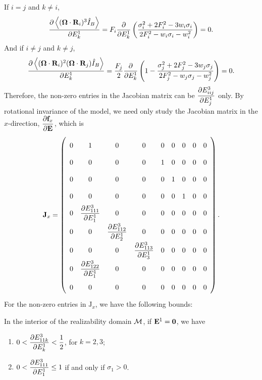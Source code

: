 If $i = j$ and $k \not= i$,
\[
\dfrac{\partial \left\langle (\boldsymbol{\Omega}\cdot\mathbf{R}_i)^3 \hat I_B \right\rangle}{\partial E^1_k} 
=  F_i \dfrac{\partial}{\partial E^1_k}\left( \dfrac{ \sigma_i^2 
    + 2 F_i^2 - 3 w_i \sigma_i }
  {2 F_i^2 - w_i \sigma_i - w_i^2}\right) 
= 0.
\]
And if $i \not= j$ and $k \not= j$,
\[
\dfrac{\partial \left\langle (\boldsymbol{\Omega}\cdot\mathbf{R}_i)^2 (\boldsymbol{\Omega}\cdot\mathbf{R}_j)
    \hat I_B \right\rangle}{\partial E^1_k} 
=  \dfrac{ F_j }{2}\dfrac{\partial}{\partial E^1_k} 
\left(1-\dfrac{ \sigma_j^2 
    + 2 F_j^2 - 3 w_j \sigma_j }
  { 2 F_j^2 - w_j \sigma_j - w_j^2 }
\right)
=  0.
\]
Therefore, the non-zero entries in the Jacobian matrix can be
$\dfrac{\partial E^3_{iij}}{\partial E^1_j}$ only. By rotational invariance of the model,
we need only study the Jacobian matrix in the $x$-direction,
$\dfrac{\partial \mathbf{f}_x}{\partial \mathbf{E}}$, which is
\begin{equation}\label{eq:Jacobi-of-ApproxM2-sx}
  \renewcommand\arraystretch{2.}
  \boldsymbol{\mathrm{J}}_x = 
  \left(
    \begin{array}{ccccccccc}
      0 & 1 & 0 & 0 & 0 & 0 & 0 & 0 & 0 \\
      0 & 0 & 0 & 0 & 1 & 0 & 0 & 0 & 0 \\
      0 & 0 & 0 & 0 & 0 & 1 & 0 & 0 & 0 \\
      0 & 0 & 0 & 0 & 0 & 0 & 1 & 0 & 0 \\
      0 & \pd{E^3_{111}}{E^1_1} & 0 & 
                                      0 & 0 & 0 & 0 & 0 & 0\\
      0 & 0 & \pd{E^3_{112}}{E^1_2} & 
                                      0 & 0 & 0 & 0 & 0 & 0\\
      0 & 0 & 0 & 
                  \pd{E^3_{113}}{E^1_3} & 0 & 0 & 0 & 0 & 0\\
      0 & \pd{E^3_{122}}{E^1_1} & 0 & 
                                      0 & 0 & 0 & 0 & 0 & 0\\
      0 & 0 & 0 & 0 & 0 & 0 & 0 & 0 & 0
    \end{array}
  \right).
\end{equation}
For the non-zero entries in $\boldsymbol{\mathrm{J}}_x$, we have the
following bounds:
\begin{lemma}\label{lem:E3_11k-bound}
  In the interior of the realizability domain ${\mathcal M}$, if
  $\mathbf{E}^1 = \boldsymbol{0}$, we have
  \begin{enumerate}
    \item $0 < \dfrac{\partial E^3_{11k}}{\partial E^1_k} < \dfrac12$, for $k = 2,3$;
    \item $0 < \dfrac{\partial E^3_{111}}{\partial E^1_1} \leq 1$ if and only if $\sigma_1 > 0$.
  \end{enumerate}
\end{lemma}
